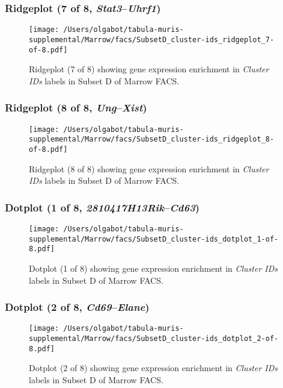 \clearpage

\subsubsection{Ridgeplot (7 of 8, \emph{Stat3}--\emph{Uhrf1})}
\begin{figure}[h]
\centering
\texttt{[image: /Users/olgabot/tabula-muris-supplemental/Marrow/facs/SubsetD\_cluster-ids\_ridgeplot\_7-of-8.pdf]}

\caption{ Ridgeplot (7 of 8)  showing gene expression enrichment in \emph{Cluster IDs} labels in Subset D of Marrow FACS. }
\end{figure}


\clearpage

\subsubsection{Ridgeplot (8 of 8, \emph{Ung}--\emph{Xist})}
\begin{figure}[h]
\centering
\texttt{[image: /Users/olgabot/tabula-muris-supplemental/Marrow/facs/SubsetD\_cluster-ids\_ridgeplot\_8-of-8.pdf]}

\caption{ Ridgeplot (8 of 8)  showing gene expression enrichment in \emph{Cluster IDs} labels in Subset D of Marrow FACS. }
\end{figure}


\clearpage

\subsubsection{Dotplot (1 of 8, \emph{2810417H13Rik}--\emph{Cd63})}
\begin{figure}[h]
\centering
\texttt{[image: /Users/olgabot/tabula-muris-supplemental/Marrow/facs/SubsetD\_cluster-ids\_dotplot\_1-of-8.pdf]}

\caption{ Dotplot (1 of 8)  showing gene expression enrichment in \emph{Cluster IDs} labels in Subset D of Marrow FACS. }
\end{figure}


\clearpage

\subsubsection{Dotplot (2 of 8, \emph{Cd69}--\emph{Elane})}
\begin{figure}[h]
\centering
\texttt{[image: /Users/olgabot/tabula-muris-supplemental/Marrow/facs/SubsetD\_cluster-ids\_dotplot\_2-of-8.pdf]}

\caption{ Dotplot (2 of 8)  showing gene expression enrichment in \emph{Cluster IDs} labels in Subset D of Marrow FACS. }
\end{figure}


